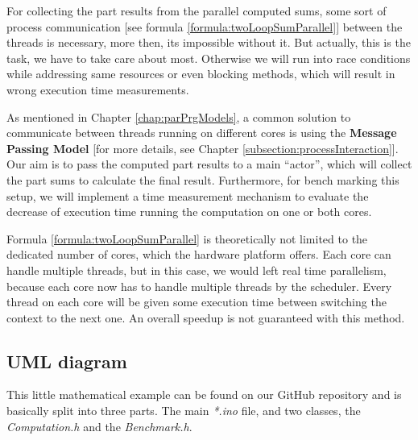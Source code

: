 For collecting the part results from the parallel computed sums, some sort of process communication [see formula \ref{formula:twoLoopSumParallel}] between the threads is necessary, more then, its impossible without it. But actually, this is the task, we have to take care about most. Otherwise we will run into race conditions while addressing same resources or even blocking methods, which will result in wrong execution time measurements.

As mentioned in Chapter \ref{chap:parPrgModels}, a common solution to communicate between threads running on different cores is using the \textbf{Message Passing Model} [for more details, see Chapter \ref{subsection:processInteraction}]. Our aim is to pass the computed part results to a main ``actor'', which will collect the part sums to calculate the final result. Furthermore, for bench marking this setup, we will implement a time measurement mechanism to evaluate the decrease of execution time running the computation on one or both cores. 

Formula \ref{formula:twoLoopSumParallel} is theoretically not limited to the dedicated number of cores, which the hardware platform offers. Each core can handle multiple threads, but in this case, we would left real time parallelism, because each core now has to handle multiple threads by the scheduler. Every thread on each core will be given some execution time between switching the context to the next one. An overall speedup is not guaranteed with this method.   

\newpage

\subsection{UML diagram}

This little mathematical example can be found on our GitHub repository \parencite{internet12} and is basically split into three parts. The main \textit{*.ino} file, and two classes, the \textit{Computation.h} and the \textit{Benchmark.h}. 

